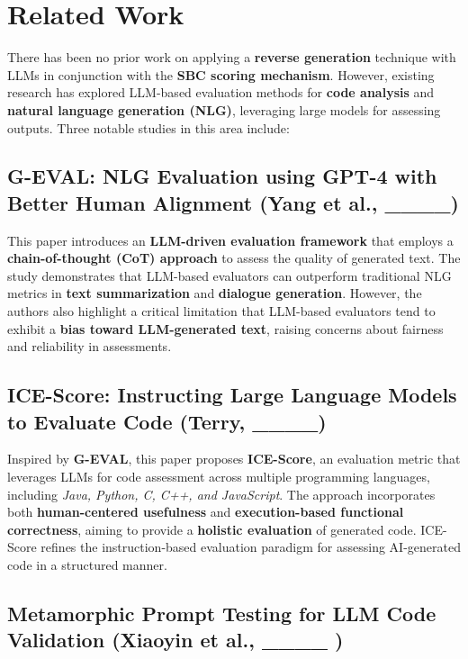\section{Related Work}
There has been no prior work on applying a \textbf{reverse generation} technique with LLMs in conjunction with the \textbf{SBC scoring mechanism}. However, existing research has explored LLM-based evaluation methods for \textbf{code analysis} and \textbf{natural language generation (NLG)}, leveraging large models for assessing outputs. Three notable studies in this area include:

\subsection{G-EVAL: NLG Evaluation using GPT-4 with Better Human Alignment (Yang et al., ____)}

This paper introduces an \textbf{LLM-driven evaluation framework} that employs a \textbf{chain-of-thought (CoT) approach} to assess the quality of generated text. The study demonstrates that LLM-based evaluators can outperform traditional NLG metrics in \textbf{text summarization} and \textbf{dialogue generation}. However, the authors also highlight a critical limitation that LLM-based evaluators tend to exhibit a \textbf{bias toward LLM-generated text}, raising concerns about fairness and reliability in assessments.

\subsection{ICE-Score: Instructing Large Language Models to Evaluate Code (Terry, ____)}

Inspired by \textbf{G-EVAL}, this paper proposes \textbf{ICE-Score}, an evaluation metric that leverages LLMs for code assessment across multiple programming languages, including \textit{Java, Python, C, C++, and JavaScript}. The approach incorporates both \textbf{human-centered usefulness} and \textbf{execution-based functional correctness}, aiming to provide a \textbf{holistic evaluation} of generated code. ICE-Score refines the instruction-based evaluation paradigm for assessing AI-generated code in a structured manner.

\subsection{Metamorphic Prompt Testing for LLM Code Validation (Xiaoyin et al., ____ )}

